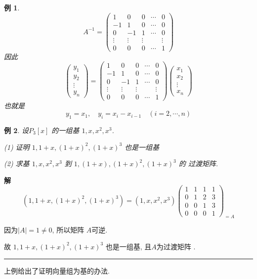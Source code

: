 \documentclass[13pt]{beamer}
\newtheorem{exa}{例}
\def\qed{\nopagebreak\hfill{\rule{4pt}{7pt}}\medbreak}
\def\sol{{\bf 解~~ }}
\begin{document}
\begin{frame}
\addtocounter{exa}{-1}
\begin{exa}
\[
{A}^{-1}=\left(\begin{array}{ccccc}
1 & 0 & 0 & \cdots& 0 \\
-1 & 1 & 0 & \cdots& 0 \\
0 & -1 & 1 &\cdots  & 0 \\
\vdots & \vdots & \vdots & & \vdots \\
0 & 0 & 0 & \cdots & 1
\end{array}\right)
\]
因此
\[
\left(\begin{array}{c}
y_{1} \\
y_{2} \\
\vdots \\
y_{n}
\end{array}\right)=\left(\begin{array}{ccccc}
1 & 0 & 0 &\cdots & 0 \\
-1 & 1 & 0 & \cdots & 0 \\
0 & -1 & 1 &\cdots & 0 \\
\vdots & \vdots & \vdots & & \vdots \\
0 & 0 & 0 &\cdots & 1
\end{array}\right)\left(\begin{array}{c}
x_{1} \\
x_{2} \\
\vdots \\
x_{n}
\end{array}\right)
\]
也就是
\[
y_1=x_{1}, \quad y_i=x_{i}-x_{i-1} \quad(i=2, \cdots, n)
\]
\end{exa} 
\end{frame}

\begin{frame}
\begin{exa}
设$P_3[x]$ 的一组基 $1, x, x^{2}, x^{3}$.

(1) 证明  $1, 1+x, (1+x)^{2}, (1+x)^{3}$ 也是一组基

(2) 求基 $1, x, x^{2}, x^{3}$ 到 $1,(1+x),(1+x)^{2},(1+x)^{3}$ 的 过渡矩阵. 
\end{exa}
\sol
$$\left( 1, 1+x,(1+x)^{2},(1+x)^{3} \right)=\left( 1, x, x^{2}, x^{3} \right)\left(\begin{array}{llll}1 & 1 & 1 & 1 \\ 0 & 1 & 2 & 3 \\ 0 & 0 & 1 & 3 \\ 0 & 0 & 0 & 1\end{array}\right)_{=A}$$

因为$|A|=1\neq 0$, 所以矩阵 $A$可逆.

故
$1,1+{x},(1+{x})^{2},(1+{x})^{3}$
也是一组基, 且$A$为过渡矩阵 .\qed
上例给出了证明向量组为基的办法. 
\end{frame}
\end{document}

